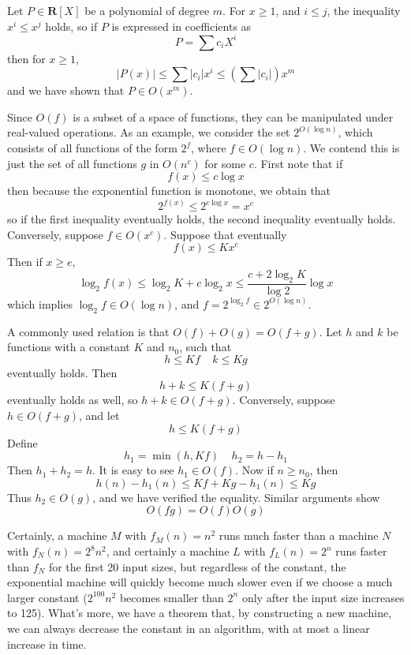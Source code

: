 \begin{example}
    Let $P \in \mathbf{R}[X]$ be a polynomial of degree $m$. For $x \geq 1$, and $i \leq j$, the inequality $x^i \leq x^j$ holds, so if $P$ is expressed in coefficients as
    \[ P = \sum c_i X^i \]
    then for $x \geq 1$,
    \[ |P(x)| \leq \sum |c_i| x^i \leq \left( \sum |c_i| \right) x^m \]
    and we have shown that $P \in O(x^m)$.
\end{example}

\begin{example}
    Since $O(f)$ is a subset of a space of functions, they can be manipulated under real-valued operations. As an example, we consider the set $2^{O(\log n)}$, which consists of all functions of the form $2^f$, where $f \in O(\log n)$. We contend this is just the set of all functions $g$ in $O(n^c)$ for some $c$. First note that if
    \[ f(x) \leq c \log x \]
    then because the exponential function is monotone, we obtain that
    \[ 2^{f(x)} \leq 2^{c \log x} = x^c \]
    so if the first inequality eventually holds, the second inequality eventually holds. Conversely, suppose $f \in O(x^c)$. Suppose that eventually
    \[ f(x) \leq K x^c \]
    Then if $x \geq e$,
    \[ \log_2 f(x) \leq \log_2 K + c \log_2 x \leq \frac{c + 2 \log_2 K}{\log 2} \log x \]
    which implies $\log_2 f \in O(\log n)$, and $f = 2^{\log_2 f} \in 2^{O(\log n)}$.
\end{example}

\begin{example}
    A commonly used relation is that $O(f) + O(g) = O(f + g)$. Let $h$ and $k$ be functions with a constant $K$ and $n_0$, such that
    \[ h \leq Kf\ \ \ \ \ k \leq Kg \]
    eventually holds. Then
    \[ h + k \leq K(f + g)\]
    eventually holds as well, so $h + k \in O(f + g)$. Conversely, suppose $h \in O(f + g)$, and let
    \[ h \leq K(f + g) \]
    Define
    \[ h_1 = \min(h,Kf)\ \ \ \ \ h_2 = h - h_1 \]
    Then $h_1 + h_2 = h$. It is easy to see $h_1 \in O(f)$. Now if $n \geq n_0$, then
    \[ h(n) - h_1(n) \leq Kf + Kg - h_1(n) \leq Kg \]
    Thus $h_2 \in O(g)$, and we have verified the equality. Similar arguments show
    \[ O(fg) = O(f)O(g) \]
\end{example}

Certainly, a machine $M$ with $f_M(n) = n^2$ runs much faster than a machine $N$ with $f_N(n) = 2^8 n^2$, and certainly a machine $L$ with $f_L(n) = 2^n$ runs faster than $f_N$ for the first 20 input sizes, but regardless of the constant, the exponential machine will quickly become much slower even if we choose a much larger constant ($2^{100} n^2$ becomes smaller than $2^n$ only after the input size increases to 125). What's more, we have a theorem that, by constructing a new machine, we can always decrease the constant in an algorithm, with at most a linear increase in time.

